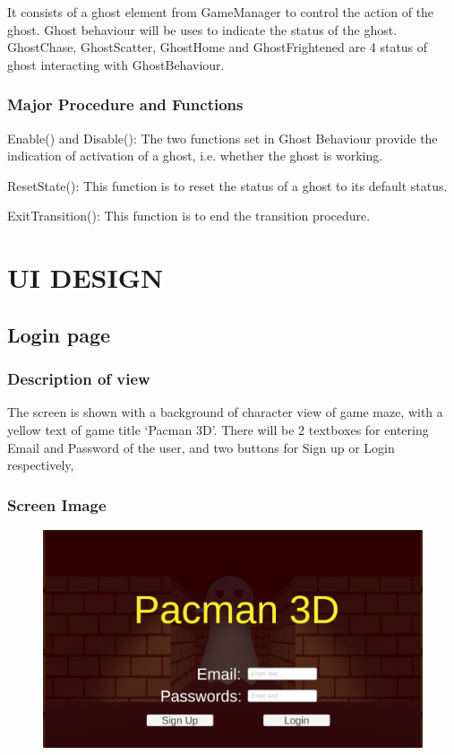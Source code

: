 \documentclass[11pt]{article}
\begin{document}
It consists of a ghost element from GameManager to control the action of the ghost. Ghost behaviour will be uses to indicate the status of the ghost. GhostChase, GhostScatter, GhostHome and GhostFrightened are 4 status of ghost interacting with GhostBehaviour.
\subsubsection{Major Procedure and Functions}
Enable() and Disable(): The two functions set in Ghost Behaviour provide the indication of activation of a ghost, i.e. whether the ghost is working.

ResetState(): This function is to reset the status of a ghost to its default status.

ExitTransition(): This function is to end the transition procedure.



\section{UI DESIGN}

\subsection{Login page}
\subsubsection{Description of view}
The screen is shown with a background of character view of game maze, with a yellow text of game title `Pacman 3D'. There will be 2 textboxes for entering Email and Password of the user, and two buttons for Sign up or Login respectively,
\subsubsection{Screen Image}
\begin{figure}[H]
    \centering
    \includegraphics*[scale=0.2]{UI0.0Login.png}
\end{figure}
\end{document}
